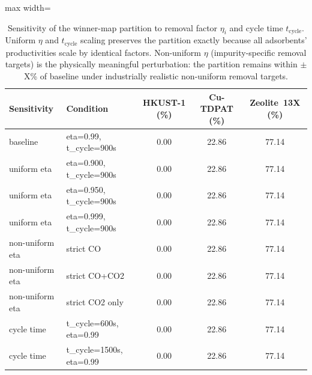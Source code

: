 \begin{table}[htbp]
\centering
\caption{Sensitivity of the winner-map partition to removal factor $\eta_i$ and cycle time $t_{\mathrm{cycle}}$. Uniform $\eta$ and $t_{\mathrm{cycle}}$ scaling preserves the partition exactly because all adsorbents' productivities scale by identical factors. Non-uniform $\eta$ (impurity-specific removal targets) is the physically meaningful perturbation: the partition remains within $\pm$X\% of baseline under industrially realistic non-uniform removal targets.}
\label{tabS:robustness}
\small
\begin{adjustbox}{max width=\textwidth}
\begin{tabular}{llccc}
\toprule
Sensitivity & Condition & HKUST-1 (\%) & Cu-TDPAT (\%) & Zeolite~13X (\%) \\
\midrule
baseline & eta=0.99, t_cycle=900s & 0.00 & 22.86 & 77.14 \\
uniform eta & eta=0.900, t_cycle=900s & 0.00 & 22.86 & 77.14 \\
uniform eta & eta=0.950, t_cycle=900s & 0.00 & 22.86 & 77.14 \\
uniform eta & eta=0.999, t_cycle=900s & 0.00 & 22.86 & 77.14 \\
non-uniform eta & strict CO & 0.00 & 22.86 & 77.14 \\
non-uniform eta & strict CO+CO2 & 0.00 & 22.86 & 77.14 \\
non-uniform eta & strict CO2 only & 0.00 & 22.86 & 77.14 \\
cycle time & t_cycle=600s, eta=0.99 & 0.00 & 22.86 & 77.14 \\
cycle time & t_cycle=1500s, eta=0.99 & 0.00 & 22.86 & 77.14 \\
\bottomrule
\end{tabular}
\end{adjustbox}
\end{table}